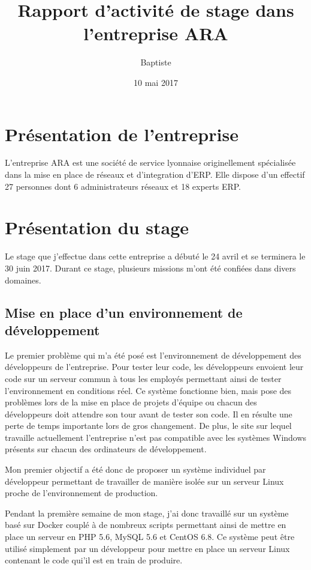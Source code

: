 \documentclass{Article}
\author{Baptiste \bsc{Saclier}}
\title{Rapport d'activité de stage dans l'entreprise ARA}
\date{10 mai 2017}
\begin{document}
\maketitle

\section{Présentation de l'entreprise}

L'entreprise ARA est une société de service lyonnaise originellement spécialisée dans la mise en place de réseaux et d'integration d'ERP. Elle dispose d'un effectif 27 personnes dont 6 administrateurs réseaux et 18 experts ERP.

\section{Présentation du stage}

Le stage que j'effectue dans cette entreprise a débuté le 24 avril et se terminera le 30 juin 2017. Durant ce stage, plusieurs missions m'ont été confiées dans divers domaines.

\subsection{Mise en place d'un environnement de développement}

Le premier problème qui m'a été posé est l'environnement de développement des développeurs de l'entreprise. Pour tester leur code, les développeurs envoient leur code sur un serveur commun à tous les employés permettant ainsi de tester l'environnement en conditions réel. Ce système fonctionne bien, mais pose des problèmes lors de la mise en place de projets d'équipe ou chacun des développeurs doit attendre son tour avant de tester son code. Il en résulte une perte de temps importante lors de gros changement. De plus, le site sur lequel travaille actuellement l'entreprise n'est pas compatible avec les systèmes Windows présents sur chacun des ordinateurs de développement.

Mon premier objectif a été donc de proposer un système individuel par développeur permettant de travailler de manière isolée sur un serveur Linux proche de l'environnement de production.

Pendant la première semaine de mon stage, j'ai donc travaillé sur un système basé sur Docker couplé à de nombreux scripts permettant ainsi de mettre en place un serveur en PHP 5.6, MySQL 5.6 et CentOS 6.8. Ce système peut être utilisé simplement par un développeur pour mettre en place un serveur Linux contenant le code qui'il est en train de produire.
\end{document}
